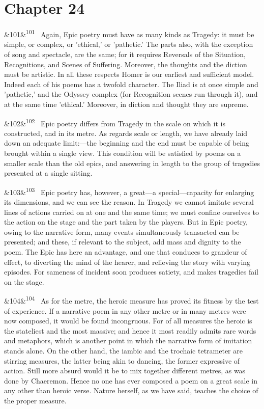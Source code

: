 \documentclass[12pt]{article}
\newcommand{\para}[1][]{\par\noindent\ifx&#1&\else\textsuperscript{\footnotesize #1}~\fi}
\begin{document}
{\section*{Chapter 24}

\para[101] Again, Epic poetry must have as many kinds as Tragedy: it must be simple, or complex, or 'ethical,' or 'pathetic.' The parts also, with the exception of song and spectacle, are the same; for it requires Reversals of the Situation, Recognitions, and Scenes of Suffering. Moreover, the thoughts and the diction must be artistic. In all these respects Homer is our earliest and sufficient model. Indeed each of his poems has a twofold character. The Iliad is at once simple and 'pathetic,' and the Odyssey complex (for Recognition scenes run through it), and at the same time 'ethical.' Moreover, in diction and thought they are supreme.

\para[102] Epic poetry differs from Tragedy in the scale on which it is constructed, and in its metre. As regards scale or length, we have already laid down an adequate limit:---the beginning and the end must be capable of being brought within a single view. This condition will be satisfied by poems on a smaller scale than the old epics, and answering in length to the group of tragedies presented at a single sitting.

\para[103] Epic poetry has, however, a great---a special---capacity for enlarging its dimensions, and we can see the reason. In Tragedy we cannot imitate several lines of actions carried on at one and the same time; we must confine ourselves to the action on the stage and the part taken by the players. But in Epic poetry, owing to the narrative form, many events simultaneously transacted can be presented; and these, if relevant to the subject, add mass and dignity to the poem. The Epic has here an advantage, and one that conduces to grandeur of effect, to diverting the mind of the hearer, and relieving the story with varying episodes. For sameness of incident soon produces satiety, and makes tragedies fail on the stage.

\para[104] As for the metre, the heroic measure has proved its fitness by the test of experience. If a narrative poem in any other metre or in many metres were now composed, it would be found incongruous. For of all measures the heroic is the stateliest and the most massive; and hence it most readily admits rare words and metaphors, which is another point in which the narrative form of imitation stands alone. On the other hand, the iambic and the trochaic tetrameter are stirring measures, the latter being akin to dancing, the former expressive of action. Still more absurd would it be to mix together different metres, as was done by Chaeremon. Hence no one has ever composed a poem on a great scale in any other than heroic verse. Nature herself, as we have said, teaches the choice of the proper measure.

}
\end{document}
